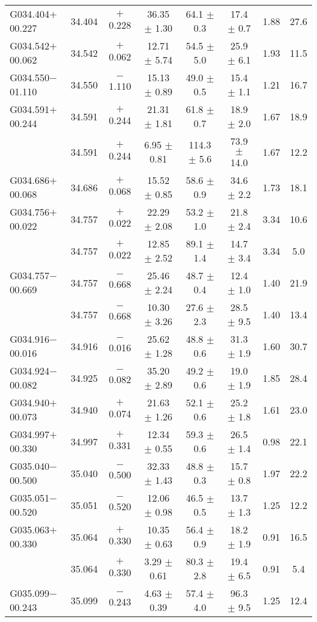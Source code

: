 \begin{ThreePartTable}
\begin{longtable}{lccccccc}
G034.404$+$00.227     &34.404&	$+$0.228	&36.35	$\pm$ 1.30	&64.1	$\pm$ 0.3	&17.4	$\pm$ 0.7	&1.88	&27.6\\
G034.542$+$00.062     &34.542&	$+$0.062	&12.71	$\pm$ 5.74	&54.5	$\pm$ 5.0	&25.9	$\pm$ 6.1	&1.93	&11.5\\
G034.550$-$01.110     &34.550&	$-$1.110	&15.13	$\pm$ 0.89	&49.0	$\pm$ 0.5	&15.4	$\pm$ 1.1	&1.21	&16.7\\
G034.591$+$00.244     &34.591&	$+$0.244	&21.31	$\pm$ 1.81	&61.8	$\pm$ 0.7	&18.9	$\pm$ 2.0	&1.67	&18.9\\
                      &34.591&	$+$0.244	&6.95	$\pm$ 0.81	&114.3	$\pm$ 5.6	&73.9	$\pm$ 14.0	&1.67	&12.2\\
G034.686$+$00.068     &34.686&	$+$0.068	&15.52	$\pm$ 0.85	&58.6	$\pm$ 0.9	&34.6	$\pm$ 2.2	&1.73	&18.1\\
G034.756$+$00.022     &34.757&	$+$0.022	&22.29	$\pm$ 2.08	&53.2	$\pm$ 1.0	&21.8	$\pm$ 2.4	&3.34	&10.6\\
                      &34.757&	$+$0.022	&12.85	$\pm$ 2.52	&89.1	$\pm$ 1.4	&14.7	$\pm$ 3.4	&3.34	&5.0\\
G034.757$-$00.669     &34.757&	$-$0.668	&25.46	$\pm$ 2.24	&48.7	$\pm$ 0.4	&12.4	$\pm$ 1.0	&1.40	&21.9\\
                      &34.757&	$-$0.668	&10.30	$\pm$ 3.26	&27.6	$\pm$ 2.3	&28.5	$\pm$ 9.5	&1.40	&13.4\\
G034.916$-$00.016     &34.916&	$-$0.016	&25.62	$\pm$ 1.28	&48.8	$\pm$ 0.6	&31.3	$\pm$ 1.9	&1.60	&30.7\\
G034.924$-$00.082     &34.925&	$-$0.082	&35.20	$\pm$ 2.89	&49.2	$\pm$ 0.6	&19.0	$\pm$ 1.9	&1.85	&28.4\\
G034.940$+$00.073     &34.940&	$+$0.074	&21.63	$\pm$ 1.26	&52.1	$\pm$ 0.6	&25.2	$\pm$ 1.8	&1.61	&23.0\\
G034.997$+$00.330     &34.997&	$+$0.331	&12.34	$\pm$ 0.55	&59.3	$\pm$ 0.6	&26.5	$\pm$ 1.4	&0.98	&22.1\\
G035.040$-$00.500     &35.040&	$-$0.500	&32.33	$\pm$ 1.43	&48.8	$\pm$ 0.3	&15.7	$\pm$ 0.8	&1.97	&22.2\\
G035.051$-$00.520     &35.051&	$-$0.520	&12.06	$\pm$ 0.98	&46.5	$\pm$ 0.5	&13.7	$\pm$ 1.3	&1.25	&12.2\\
G035.063$+$00.330     &35.064&	$+$0.330	&10.35	$\pm$ 0.63	&56.4	$\pm$ 0.9	&18.2	$\pm$ 1.9	&0.91	&16.5\\
                      &35.064&	$+$0.330	&3.29	$\pm$ 0.61	&80.3	$\pm$ 2.8	&19.4	$\pm$ 6.5	&0.91	&5.4\\
G035.099$-$00.243     &35.099&	$-$0.243	&4.63	$\pm$ 0.39	&57.4	$\pm$ 4.0	&96.3	$\pm$ 9.5	&1.25	&12.4\\

\end{longtable}
\end{ThreePartTable}
